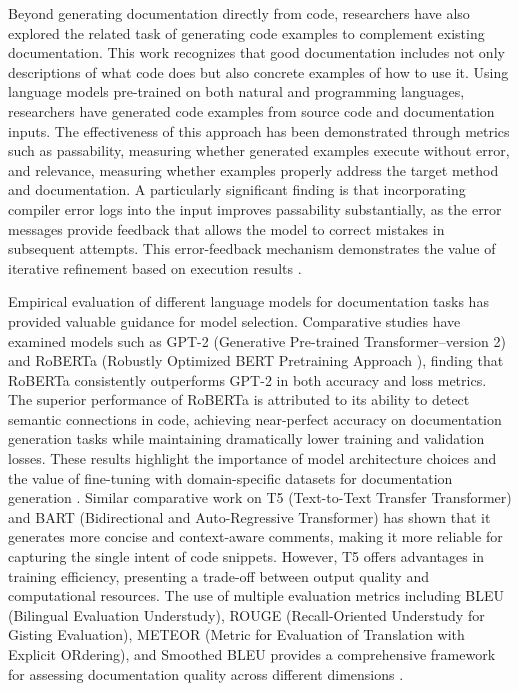 Beyond generating documentation directly from code, researchers have also explored the related task of generating code examples to complement existing documentation. This work recognizes that good documentation includes not only descriptions of what code does but also concrete examples of how to use it. Using language models pre-trained on both natural and programming languages, researchers have generated code examples from source code and documentation inputs. The effectiveness of this approach has been demonstrated through metrics such as passability, measuring whether generated examples execute without error, and relevance, measuring whether examples properly address the target method and documentation. A particularly significant finding is that incorporating compiler error logs into the input improves passability substantially, as the error messages provide feedback that allows the model to correct mistakes in subsequent attempts. This error-feedback mechanism demonstrates the value of iterative refinement based on execution results \cite{KhanUddin2023}.

Empirical evaluation of different language models for documentation tasks has provided valuable guidance for model selection. Comparative studies have examined models such as GPT-2 (Generative Pre-trained Transformer–version 2) and RoBERTa (Robustly Optimized BERT Pretraining Approach ), finding that RoBERTa consistently outperforms GPT-2 in both accuracy and loss metrics. The superior performance of RoBERTa is attributed to its ability to detect semantic connections in code, achieving near-perfect accuracy on documentation generation tasks while maintaining dramatically lower training and validation losses. These results highlight the importance of model architecture choices and the value of fine-tuning with domain-specific datasets for documentation generation \cite{Thota2024}. Similar comparative work on T5 (Text-to-Text Transfer Transformer) and BART (Bidirectional and Auto-Regressive Transformer) has shown that it generates more concise and context-aware comments, making it more reliable for capturing the single intent of code snippets. However, T5 offers advantages in training efficiency, presenting a trade-off between output quality and computational resources. The use of multiple evaluation metrics including BLEU (Bilingual Evaluation Understudy), ROUGE (Recall-Oriented Understudy for Gisting Evaluation), METEOR (Metric for Evaluation of Translation with Explicit ORdering), and Smoothed BLEU provides a comprehensive framework for assessing documentation quality across different dimensions \cite{GhaleDabbagh2025}.

